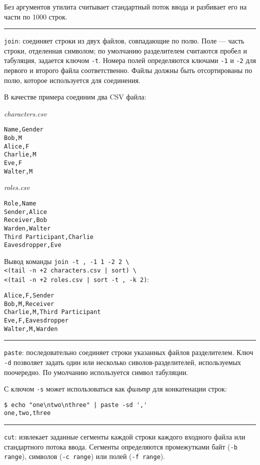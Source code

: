 \documentclass[listings]{labreport}
\begin{document}
Без аргументов утилита считывает стандартный поток ввода и разбивает его на части по 1000 строк.

\noindent\rule{\textwidth}{1pt}

\texttt{join}: соединяет строки из двух файлов, совпадающие по полю. Поле — часть строки, отделенная символом;
по умолчанию разделителем считаются пробел и табуляция, задается ключом \texttt{-t}. Номера полей определяются
ключами \texttt{-1} и \texttt{-2} для первого и второго файла соответственно. Файлы должны быть отсортированы по
полю, которое используется для соединения.

В качестве примера соединим два CSV файла:

\begin{multicols}{2}
\noindent\textit{characters.csv}
\begin{verbatim}
Name,Gender
Bob,M
Alice,F
Charlie,M
Eve,F
Walter,M
\end{verbatim}

\noindent\textit{roles.csv}
\begin{verbatim}
Role,Name
Sender,Alice
Receiver,Bob
Warden,Walter
Third Participant,Charlie
Eavesdropper,Eve
\end{verbatim}
\end{multicols}

Вывод команды \texttt{join -t , -1 1 -2 2 {\textbackslash}} \\
\texttt{<(tail -n +2 characters.csv | sort) {\textbackslash}} \\
\texttt{<(tail -n +2 roles.csv | sort -t , -k 2)}:

\begin{verbatim}
Alice,F,Sender
Bob,M,Receiver
Charlie,M,Third Participant
Eve,F,Eavesdropper
Walter,M,Warden
\end{verbatim}

\noindent\rule{\textwidth}{1pt}

\texttt{paste}: последовательно соединяет строки указанных файлов разделителем.
Ключ \texttt{-d} позволяет задать один или несколько сиволов-разделителей, используемых
поочередно. По умолчанию используется символ табуляции.

С ключом \texttt{-s} может использоваться как \textit{фильтр} для конкатенации строк:
\begin{verbatim}
$ echo "one\ntwo\nthree" | paste -sd ','
one,two,three
\end{verbatim}

\noindent\rule{\textwidth}{1pt}

\texttt{cut}: извлекает заданные сегменты каждой строки каждого входного файла или
стандартного потока ввода. Сегменты определяются промежутками байт (\texttt{-b range}),
символов (\texttt{-c range}) или полей (\texttt{-f range}).
\end{document}
